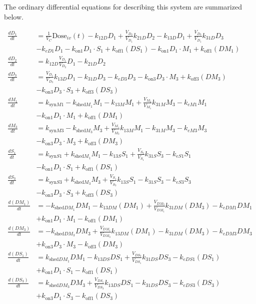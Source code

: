 The ordinary differential equations for describing this system are summarized below.

\begin{align}
\frac{dD_1}{dt} &= \frac{1}{V_C}\text{Dose}_{iv}(t) - k_{12D}D_1 + \frac{V_{D_2}}{V_{D_1}}k_{21D}D_2 - k_{13D}D_1 \nonumber 
+ \frac{V_{D_3}}{V_{D_1}}k_{31D}D_3\\& - k_{eD1}D_1 - k_{\text{on}1}D_1 \cdot S_1 + k_{\text{off}1}(DS_1)- k_{\text{on}1}D_1 \cdot M_1 + k_{\text{off}1}(DM_1)  \\
\frac{dD_2}{dt} &= k_{12D}\frac{V_{D_1}}{V_{D_2}}D_1 - k_{21D}D_2 \\
\frac{dD_3}{dt} &= \frac{V_{D_1}}{V_{D_3}}k_{13D}D_1 - k_{31D}D_3 - k_{eD3}D_3- k_{\text{on}3}D_3 \cdot M_3 + k_{\text{off}3}(DM_3)\nonumber  \\&- k_{\text{on}3}D_3 \cdot S_3 + k_{\text{off}3}(DS_3) \\
\frac{dM_1}{dt} &= k_{\text{syn}M1}-k_{\text{shed}M_1}M_1 - k_{13M}M_1 + \frac{V_{M_3}}{V_{M_1}}k_{31M}M_3- k_{eM1}M_1\nonumber  \\&- k_{\text{on}1}D_1 \cdot M_1 + k_{\text{off}1}(DM_1) \\
\frac{dM_3}{dt} &= k_{\text{syn}M3}-k_{\text{shed}M_3}M_3  + \frac{V_{M_1}}{V_{M_3}}k_{13M}M_1 - k_{31M}M_3 - k_{eM3}M_3\nonumber \\&- k_{\text{on}3}D_3 \cdot M_3 + k_{\text{off}3}(DM_3) \\
\frac{dS_1}{dt} &= k_{\text{syn}S1}+k_{\text{shed}M_1}M_1  - k_{13S}S_1 + \frac{V_{S_3}}{V_{S_1}}k_{31S}S_3 - k_{eS1}S_1 \nonumber\\ &- k_{\text{on}1}D_1 \cdot S_1  + k_{\text{off}1}(DS_1)  \\
\frac{dS_3}{dt} &= k_{\text{syn}S3}+k_{\text{shed}M_3}M_3 + \frac{V_{S_1}}{V_{S_3}}k_{13S}S_1 - k_{31S}S_3 - k_{eS3}S_3 \nonumber\\ &- k_{\text{on}3}D_3 \cdot S_3 + k_{\text{off}3}(DS_3)  \\
\frac{d(DM_1)}{dt} &=-k_{\text{shed}DM_1}DM_1 - k_{13DM}(DM_1) + \frac{V_{DM_3}}{V_{DM_1}}k_{31DM}(DM_3)  - k_{eDM1}DM_1\nonumber\\&+k_{\text{on}1}D_1 \cdot M_1 - k_{\text{off}1}(DM_1)  \\
\frac{d(DM_3)}{dt} &= -k_{\text{shed}DM_3}DM_3 + \frac{V_{DM_1}}{V_{DM_3}}k_{13DM}(DM_1) - k_{31DM}(DM_3) - k_{eDM3}DM_3\nonumber \\&+k_{\text{on}3}D_3 \cdot M_3 - k_{\text{off}3}(DM_3)  \\
\frac{d(DS_1)}{dt} &=k_{\text{shed}DM_1}DM_1  - k_{13DS}DS_1 + \frac{V_{DS_3}}{V_{DS_1}}k_{31DS}DS_3 - k_{eDS1}(DS_1)  \nonumber\\ &+ k_{\text{on}1}D_1 \cdot S_1 - k_{\text{off}1}(DS_1)  \\
\frac{d(DS_3)}{dt} &=k_{\text{shed}DM_3}DM_3 + \frac{V_{DS_1}}{V_{DS_3}}k_{13DS}DS_1 - k_{31DS}DS_3 - k_{eDS3}(DS_3)  \nonumber\\ &+ k_{\text{on}3}D_1 \cdot S_3 - k_{\text{off}1}(DS_3)  
\end{align}

